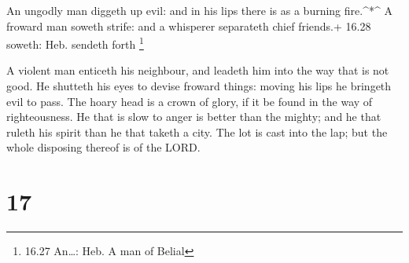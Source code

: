  An ungodly man diggeth up evil: and in his lips there is
as a burning fire.\^{}*\^{}  A froward man soweth strife:
and a whisperer separateth chief friends.+ 16.28 soweth: Heb. sendeth
forth \footnote{16.27 An\ldots: Heb. A man of Belial}

 A violent man enticeth his neighbour, and leadeth him into
the way that is not good.  He shutteth his eyes to devise
froward things: moving his lips he bringeth evil to pass. 
The hoary head is a crown of glory, if it be found in the way of
righteousness.  He that is slow to anger is better than the
mighty; and he that ruleth his spirit than he that taketh a city.
 The lot is cast into the lap; but the whole disposing
thereof is of the LORD.

\hypertarget{section-16}{%
\section{17}\label{section-16}}


